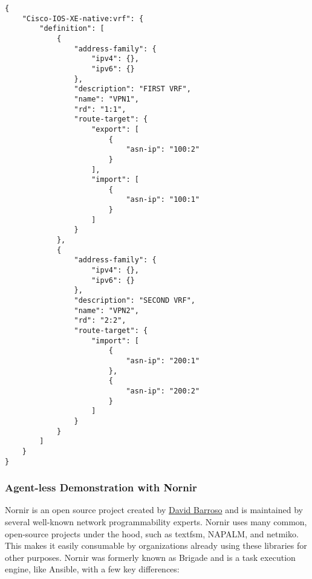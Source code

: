 \begin{verbatim}
{
    "Cisco-IOS-XE-native:vrf": {
        "definition": [
            {
                "address-family": {
                    "ipv4": {},
                    "ipv6": {}
                },
                "description": "FIRST VRF",
                "name": "VPN1",
                "rd": "1:1",
                "route-target": {
                    "export": [
                        {
                            "asn-ip": "100:2"
                        }
                    ],
                    "import": [
                        {
                            "asn-ip": "100:1"
                        }
                    ]
                }
            },
            {
                "address-family": {
                    "ipv4": {},
                    "ipv6": {}
                },
                "description": "SECOND VRF",
                "name": "VPN2",
                "rd": "2:2",
                "route-target": {
                    "import": [
                        {
                            "asn-ip": "200:1"
                        },
                        {
                            "asn-ip": "200:2"
                        }
                    ]
                }
            }
        ]
    }
}
\end{verbatim}

\subsubsection{Agent-less Demonstration with Nornir}
Nornir is an open source project created by
\href{https://twitter.com/dbarrosop/}{David Barroso} and is maintained by
several well-known network programmability experts. Nornir uses many common,
open-source projects under the hood, such as textfsm, NAPALM, and netmiko.
This makes it easily consumable by organizations already using these libraries
for other purposes.  Nornir was formerly known as Brigade and is a task
execution engine, like Ansible, with a few key differences:

